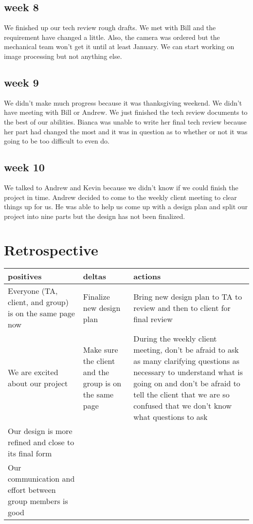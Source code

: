 \documentclass[onecolumn, draftclsnofoot,10pt, compsoc]{IEEEtran}
\begin{document}
\subsection{week 8}
We finished up our tech review rough drafts. We met with Bill and the requirement have changed a little. Also, the camera was ordered but the mechanical team won't get it until at least January. We can start working on image processing but not anything else.


\subsection{week 9}
We didn’t make much progress because it was thanksgiving weekend. We didn’t have meeting with Bill or Andrew. We just finished the tech review documents to the best of our abilities. Bianca was unable to write her final tech review because her part had changed the most and it was in question as to whether or not it was going to be too difficult to even do. 

\subsection{week 10}
We talked to Andrew and Kevin because we didn’t know if we could finish the project in time. Andrew decided to come to the weekly client meeting to clear things up for us. He was able to help us come up with a design plan and split our project into nine parts but the design has not been finalized. 

\section{Retrospective }

\begin{tabular}{|p{5cm} | p{5cm} | p{5cm}|} 
	\hline
	positives  & deltas  & actions \\ [0.5ex] 
	\hline\hline
	Everyone (TA, client, and group) is on the same page now & Finalize new design plan & Bring new design plan to TA to review and then to client for final review\\
	\hline
	We are excited about our project & Make sure the client and the group is on the same page & During the weekly client meeting, don’t be afraid to ask as many clarifying questions as necessary to understand what is going on and don’t be afraid to tell the client that we are so confused that we don’t know what questions to ask \\
	\hline
	Our design is more refined and close to its final form &  &  \\
	\hline  
	Our communication and effort between group members is good &  & \\
	\hline

	
\end{tabular}




\end{document}

